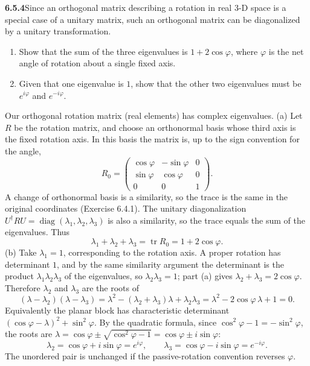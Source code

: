 \par\bigskip
\noindent\textbf{6.5.4}\quad Since an orthogonal matrix describing a rotation
in real 3-D space is a special case of a unitary matrix, such an orthogonal
matrix can be diagonalized by a unitary transformation.
\begin{enumerate}
\item[(a)] Show that the sum of the three eigenvalues is $1+2\cos\varphi$,
  where $\varphi$ is the net angle of rotation about a single fixed axis.
\item[(b)] Given that one eigenvalue is $1$, show that the other two
  eigenvalues must be $e^{i\varphi}$ and $e^{-i\varphi}$.
\end{enumerate}
Our orthogonal rotation matrix (real elements) has 
complex eigenvalues.
\solution
(a) Let $R$ be the rotation matrix, and choose an orthonormal basis
whose third axis is the fixed rotation axis. In this basis the matrix
is, up to the sign convention for the angle,
\[
R_0=\begin{pmatrix}\cos\varphi&-\sin\varphi&0\\
\sin\varphi&\cos\varphi&0\\0&0&1\end{pmatrix}.
\]
A change of orthonormal basis is a similarity, so the trace is the same
in the original coordinates (Exercise 6.4.1). The unitary
diagonalization $U^\dagger RU=\operatorname{diag}(\lambda_1,\lambda_2,\lambda_3)$
is also a similarity, so the trace equals the sum of the eigenvalues.
Thus
\[
\boxed{\lambda_1+\lambda_2+\lambda_3
=\operatorname{tr}R_0=1+2\cos\varphi.}
\]
(b) Take $\lambda_1=1$, corresponding to the rotation axis. A proper
rotation has determinant $1$, and by the same similarity argument the
determinant is the product $\lambda_1\lambda_2\lambda_3$ of the
eigenvalues, so $\lambda_2\lambda_3=1$; part (a) gives
$\lambda_2+\lambda_3=2\cos\varphi$. Therefore $\lambda_2$ and
$\lambda_3$ are the roots of
\[
(\lambda-\lambda_2)(\lambda-\lambda_3)
=\lambda^2-(\lambda_2+\lambda_3)\lambda+\lambda_2\lambda_3
=\lambda^2-2\cos\varphi\,\lambda+1=0.
\]
Equivalently the planar block has characteristic determinant
$(\cos\varphi-\lambda)^2+\sin^2\varphi$. By the quadratic formula,
since $\cos^2\varphi-1=-\sin^2\varphi$, the roots are
$\lambda=\cos\varphi\pm\sqrt{\cos^2\varphi-1}=\cos\varphi\pm i\sin\varphi$:
\[
\boxed{\lambda_2=\cos\varphi+i\sin\varphi=e^{i\varphi},\qquad
\lambda_3=\cos\varphi-i\sin\varphi=e^{-i\varphi}.}
\]
The unordered pair is unchanged if the passive-rotation convention
reverses $\varphi$.

